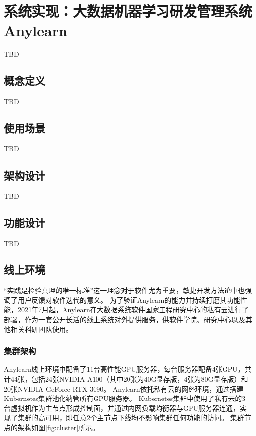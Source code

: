 
\chapter{系统实现：大数据机器学习研发管理系统Anylearn}

TBD


\section{概念定义}

TBD


\section{使用场景}

TBD


\section{架构设计}

TBD


\section{功能设计}

TBD


\section{线上环境}

“实践是检验真理的唯一标准”这一理念对于软件尤为重要，敏捷开发方法论中也强调了用户反馈对软件迭代的意义。
为了验证Anylearn的能力并持续打磨其功能性能，2021年7月起，Anylearn在大数据系统软件国家工程研究中心的私有云进行了部署，作为一套公开长活的线上系统对外提供服务，供软件学院、研究中心以及其他相关科研团队使用。

\subsection{集群架构}
Anylearn线上环境中配备了11台高性能GPU服务器，每台服务器配备4张GPU，共计44张，包括24张NVIDIA A100（其中20张为40G显存版，4张为80G显存版）和20张NVIDIA GeForce RTX 3090。
Anylearn依托私有云的网络环境，通过搭建Kubernetes集群池化纳管所有GPU服务器。
Kubernetes集群中使用了私有云的3台虚拟机作为主节点形成控制面，并通过内网负载均衡器与GPU服务器连通，实现了集群的高可用，即任意2个主节点下线均不影响集群任何功能的访问。
集群节点的架构如图\ref{fig:cluster}所示。

